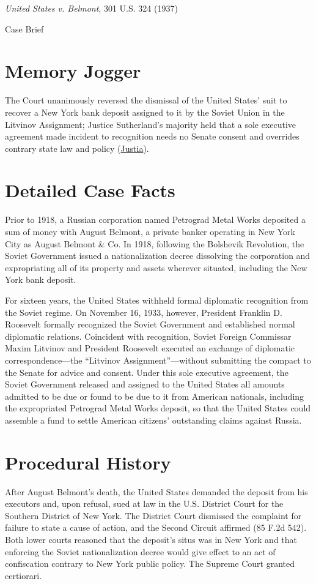 \documentclass[12pt]{article}
\begin{document}
\begin{center}
{\LARGE \textit{United States v. Belmont}, 301 U.S. 324 (1937)\par}
\vspace{0.8em}
{\large Case Brief\par}
\end{center}
\vspace{1em}

\section{Memory Jogger}
The Court unanimously reversed the dismissal of the United States' suit to recover a New York bank deposit assigned to it by the Soviet Union in the Litvinov Assignment; Justice Sutherland's majority held that a sole executive agreement made incident to recognition needs no Senate consent and overrides contrary state law and policy (\href{https://supreme.justia.com/cases/federal/us/301/324/}{Justia}).

\section{Detailed Case Facts}
Prior to 1918, a Russian corporation named Petrograd Metal Works deposited a sum of money with August Belmont, a private banker operating in New York City as August Belmont \& Co. In 1918, following the Bolshevik Revolution, the Soviet Government issued a nationalization decree dissolving the corporation and expropriating all of its property and assets wherever situated, including the New York bank deposit.

For sixteen years, the United States withheld formal diplomatic recognition from the Soviet regime. On November 16, 1933, however, President Franklin D. Roosevelt formally recognized the Soviet Government and established normal diplomatic relations. Coincident with recognition, Soviet Foreign Commissar Maxim Litvinov and President Roosevelt executed an exchange of diplomatic correspondence---the ``Litvinov Assignment''---without submitting the compact to the Senate for advice and consent. Under this sole executive agreement, the Soviet Government released and assigned to the United States all amounts admitted to be due or found to be due to it from American nationals, including the expropriated Petrograd Metal Works deposit, so that the United States could assemble a fund to settle American citizens' outstanding claims against Russia.

\section{Procedural History}
After August Belmont's death, the United States demanded the deposit from his executors and, upon refusal, sued at law in the U.S. District Court for the Southern District of New York. The District Court dismissed the complaint for failure to state a cause of action, and the Second Circuit affirmed (85 F.2d 542). Both lower courts reasoned that the deposit's situs was in New York and that enforcing the Soviet nationalization decree would give effect to an act of confiscation contrary to New York public policy. The Supreme Court granted certiorari.
\end{document}
